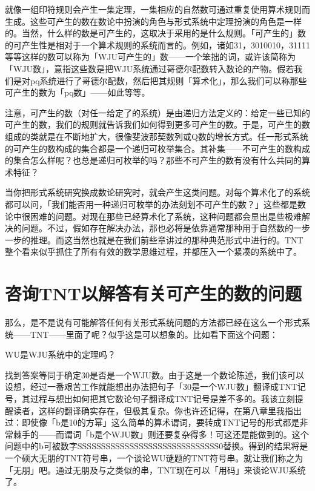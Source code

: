 \documentclass[
  12pt,
  twoside,
  openright,
  oldfontcommands,
]{memoir}
\begin{document}
就像一组印符规则会产生一集定理，一集相应的自然数可通过重复使用算术规则而生成。这些可产生的数在数论中扮演的角色与形式系统中定理扮演的角色是一样的。当然，什么样的数是可产生的，这取决于采用的是什么规则。「可产生的」数的可产生性是相对于一个算术规则的系统而言的。例如，诸如31，3010010，31111等等这样的数可以称为「WJU可产生的」数------一个笨拙的词，或许该简称为「WJU数」，意指这些数是把WJU系统通过哥德尔配数转入数论的产物。假若我们是对pq系统进行了哥德尔配数，然后把其规则「算术化」，那么我们可以称那些可产生的数为「pq数」------如此等等。

注意，可产生的数（对任一给定了的系统）是由递归方法定义的：给定一些已知的可产生的数，我们的规则就告诉我们如何得到更多可产生的数。于是，可产生的数组成的类就是在不断地扩大，很像斐波那契数列或Q数的增长方式。任一形式系统的可产生的数构成的集合都是一个递归可枚举集合。其补集------不可产生的数构成的集合怎么样呢？也总是递归可枚举的吗？那些不可产生的数有没有什么共同的算术特征？

当你把形式系统研究换成数论研究时，就会产生这类问题。对每个算术化了的系统都可以问，「我们能否用一种递归可枚举的办法刻划不可产生的数？」这些都是数论中很困难的问题。对现在那些已经算术化了系统，这种问题都会显出是些极难解决的问题。不过，假如存在解决办法，那也必将是依靠通常那种用于自然数的一步一步的推理。而这当然也就是在我们前些章讲过的那种典范形式中进行的。TNT整个看来似乎抓住了所有有效的数学思维过程，并都压入一个紧凑的系统中了。

\section{咨询TNT以解答有关可产生的数的问题}

那么，是不是说有可能解答任何有关形式系统问题的方法都已经在这么一个形式系统------TNT------里面了呢？似乎这是可以想象的。比如看下面这个问题：

WU是WJU系统中的定理吗？

找到答案等同于确定30是否是一个WJU数。由于这是一个数论陈述，我们该可以设想，经过一番艰苦工作就能想出办法把句子「30是一个WJU数」翻译成TNT记号，其过程与想出如何把其它数论句子翻译成TNT记号是差不多的。我该立刻提醒读者，这样的翻译确实存在，但极其复杂。你也许还记得，在第八章里我指出过：即使像「b是10的方幂」这么简单的算术谓词，要转成TNT记号的形式都是非常棘手的------而谓词「b是个WJU数」则还要复杂得多！可这还是能做到的。这个问题中的b可被数字SSSSSSSSSSSSSSSSSSSSSSSSSSSSSS0替换。得到的结果将是一个硕大无朋的TNT符号串，一个谈论WU谜题的TNT符号串。就让我们称之为「无朋」吧。通过无朋及与之类似的串，TNT现在可以「用码」来谈论WJU系统了。
\end{document}
